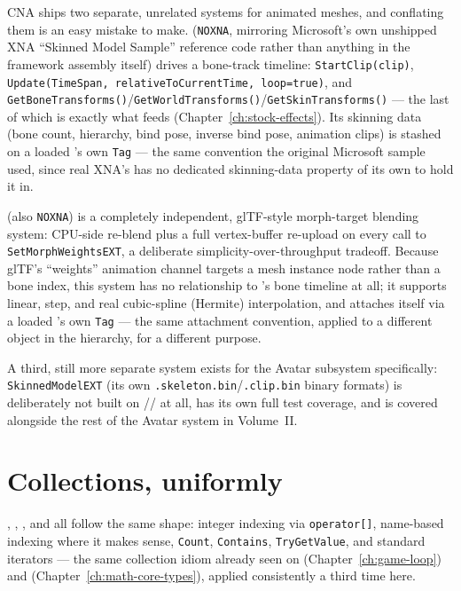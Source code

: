 CNA ships two separate, unrelated systems for animated meshes, and conflating them is an
easy mistake to make.  (\texttt{NOXNA}, mirroring Microsoft's own
unshipped XNA ``Skinned Model Sample'' reference code rather than anything in the framework
assembly itself) drives a bone-track timeline: \texttt{StartClip(clip)},
\texttt{Update(TimeSpan, relativeToCurrentTime, loop=true)}, and
\texttt{GetBoneTransforms()}/\texttt{GetWorldTransforms()}/\texttt{GetSkinTransforms()} ---
the last of which is exactly what feeds 
(Chapter~\ref{ch:stock-effects}). Its skinning data (bone count, hierarchy, bind pose,
inverse bind pose, animation clips) is stashed on a loaded 's own
\texttt{Tag} --- the same convention the original Microsoft sample used, since real XNA's
 has no dedicated skinning-data property of its own to hold it in.

 (also \texttt{NOXNA}) is a completely independent, glTF-style
morph-target blending system: CPU-side re-blend plus a full vertex-buffer re-upload on every
call to \texttt{SetMorphWeightsEXT}, a deliberate simplicity-over-throughput tradeoff.
Because glTF's ``weights'' animation channel targets a mesh instance node rather than a bone
index, this system has no relationship to 's bone timeline at all;
it supports linear, step, and real cubic-spline (Hermite) interpolation, and attaches itself
via a loaded 's own \texttt{Tag} --- the same attachment convention,
applied to a different object in the hierarchy, for a different purpose.

A third, still more separate system exists for the Avatar subsystem specifically:
\texttt{SkinnedModelEXT} (its own \texttt{.skeleton.bin}/\texttt{.clip.bin} binary formats) is
deliberately not built on // at all,
has its own full test coverage, and is covered alongside the rest of the Avatar system in
Volume~II.

\section{Collections, uniformly}

, ,
, and  all follow the same
shape: integer indexing via \texttt{operator[]}, name-based indexing where it makes sense,
\texttt{Count}, \texttt{Contains}, \texttt{TryGetValue}, and standard iterators --- the same
collection idiom already seen on 
(Chapter~\ref{ch:game-loop}) and 
(Chapter~\ref{ch:math-core-types}), applied consistently a third time here.

